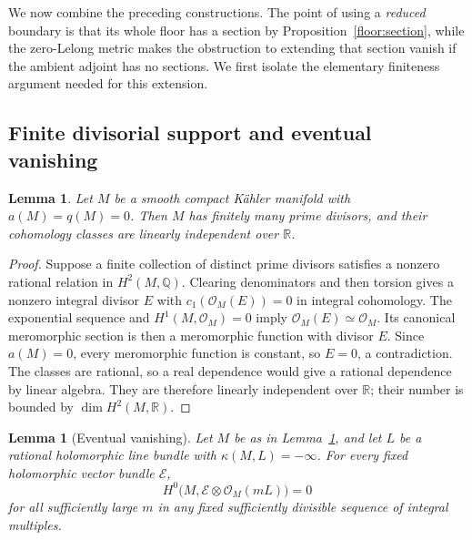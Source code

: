 \documentclass[11pt,letterpaper]{article}
\newtheorem{lemma}[theorem]{Lemma}
\theoremstyle{definition}
\theoremstyle{remark}
\begin{document}
We now combine the preceding constructions. The point of using a
\emph{reduced} boundary is that its whole floor has a section by
Proposition~\ref{floor:section}, while the zero-Lelong metric makes
the obstruction to extending that section vanish if the ambient
adjoint has no sections. We first isolate the elementary finiteness
argument needed for this extension.

\subsection{Finite divisorial support and eventual vanishing}

\begin{lemma}\label{end:finite-primes}
Let \(M\) be a smooth compact K\"ahler manifold with
\(a(M)=q(M)=0\). Then \(M\) has finitely many prime divisors, and
their cohomology classes are linearly independent over \(\mathbb{R}\).
\end{lemma}

\begin{proof}
Suppose a finite collection of distinct prime divisors satisfies a
nonzero rational relation in \(H^2(M,\mathbb{Q})\). Clearing denominators
and then torsion gives a nonzero integral divisor \(E\) with
\(c_1(\mathcal{O}_M(E))=0\) in integral cohomology. The exponential
sequence and \(H^1(M,\mathcal{O}_M)=0\) imply
\(\mathcal{O}_M(E)\simeq\mathcal{O}_M\). Its canonical meromorphic section is
then a meromorphic function with divisor \(E\). Since \(a(M)=0\),
every meromorphic function is constant, so \(E=0\), a
contradiction. The classes are rational, so a real dependence would
give a rational dependence by linear algebra. They are therefore
linearly independent over \(\mathbb{R}\); their number is bounded by
\(\dim H^2(M,\mathbb{R})\).
\end{proof}

\begin{lemma}[Eventual vanishing]\label{end:eventual}
Let \(M\) be as in Lemma~\ref{end:finite-primes}, and let \(L\)
be a rational holomorphic line bundle with \(\kappa(M,L)=-\infty\).
For every fixed holomorphic vector bundle \(\mathcal E\),
\begin{equation}\label{end:fixed-bundle-vanishing}
 H^0\bigl(M,\mathcal E\otimes\mathcal{O}_M(mL)\bigr)=0
\end{equation}
for all sufficiently large \(m\) in any fixed sufficiently divisible
sequence of integral multiples.
\end{lemma}
\end{document}
